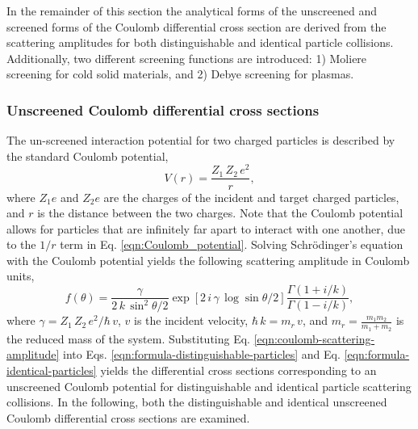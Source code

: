In the remainder of this section the analytical forms of the unscreened and screened forms of the Coulomb differential cross section are derived from the scattering amplitudes for both distinguishable and identical particle collisions. Additionally, two different screening functions are introduced: 1) Moliere screening for cold solid materials, and 2) Debye screening for plasmas.

\subsubsection{Unscreened Coulomb differential cross sections}
The un-screened interaction potential for two charged particles is described by the standard Coulomb potential,
\begin{equation} \label{eqn:Coulomb_potential}
    V(r) = \dfrac{Z_1 \, Z_2 \, e^2}{r},
\end{equation}
where $Z_1 e$ and $Z_2 e$ are the charges of the incident and target charged particles, and $r$ is the distance between the two charges. Note that the Coulomb potential allows for particles that are infinitely far apart to interact with one another, due to the $1/r$ term in Eq. \eqref{eqn:Coulomb_potential}. Solving Schr\"{o}dinger's equation with the Coulomb potential yields the following scattering amplitude in Coulomb units,
\begin{equation} \label{eqn:coulomb-scattering-amplitude}
    f(\theta) = \dfrac{\gamma}{2 \, k \, \sin^2 \theta/2} \exp \left[ 2 \, i \, \gamma \, \log \sin \theta/2 \right] \dfrac{\Gamma(1 + i/k)}{\Gamma(1 - i/k)},
\end{equation}
where $\gamma = Z_1 \, Z_2 \, e^2 / \hbar \, v$, $v$ is the incident velocity, $\hbar \, k = m_r \, v$, and $m_r = \frac{m_1 m_2}{m_1 + m_2}$ is the reduced mass of the system. Substituting Eq. \eqref{eqn:coulomb-scattering-amplitude} into Eqs. \eqref{eqn:formula-distinguishable-particles} and Eq. \eqref{eqn:formula-identical-particles} yields the differential cross sections corresponding to an unscreened Coulomb potential for distinguishable and identical particle scattering collisions. In the following, both the distinguishable and identical unscreened Coulomb differential cross sections are examined.


